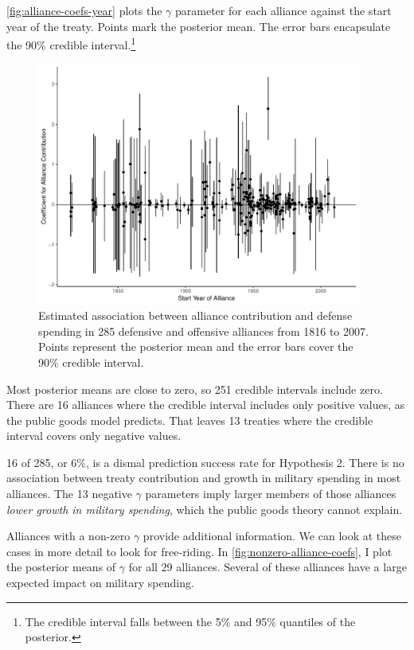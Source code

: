 \documentclass[12pt]{article}
\begin{document}
\autoref{fig:alliance-coefs-year} plots the $\gamma$ parameter for each alliance against the start year of the treaty.
Points mark the posterior mean. 
The error bars encapsulate the 90\% credible interval.\footnote{The credible interval falls between the 5\% and 95\% quantiles of the posterior.}  


\begin{figure}[htbp]
	\centering
		\includegraphics[width=0.95\textwidth]{alliance-coefs-year.pdf}
	\caption{Estimated association between alliance contribution and defense spending in 285 defensive and offensive alliances from 1816 to 2007. Points represent the posterior mean and the error bars cover the 90\% credible interval.}
	\label{fig:alliance-coefs-year}
\end{figure}


Most posterior means are close to zero, so 251 credible intervals include zero. 
There are 16 alliances where the credible interval includes only positive values, as the public goods model predicts. 
That leaves 13 treaties where the credible interval covers only negative values. 


16 of 285, or 6\%, is a dismal prediction success rate for Hypothesis 2. 
There is no association between treaty contribution and growth in military spending in most alliances.
The 13 negative $\gamma$ parameters imply larger members of those alliances \emph{lower growth in military spending}, which the public goods theory cannot explain. 


Alliances with a non-zero $\gamma$ provide additional information. 
We can look at these cases in more detail to look for free-riding. 
In \autoref{fig:nonzero-alliance-coefs}, I plot the posterior means of $\gamma$ for all 29 alliances.  
Several of these alliances have a large expected impact on military spending. 
\end{document}
